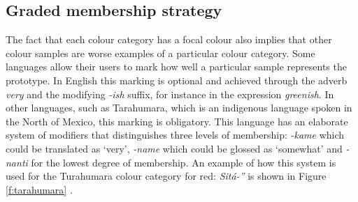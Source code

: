 \subsection{Graded membership strategy}

The fact that each colour category has a focal colour also
implies that other colour samples are worse examples of a particular
colour category. Some languages allow their users to mark how well a
particular sample represents the prototype. In English this marking is
optional and achieved through the adverb \textit{very} and the modifying
\textit{-ish} suffix, for instance in the expression \textit{greenish}. In other
languages, such as Tarahumara, which is an indigenous language spoken
in the North of Mexico, this marking is obligatory. This language has
an elaborate system of modifiers that distinguishes three levels of
membership: \textit{-kame} which could be translated as `very', \textit{-name}
which could be glossed as `somewhat' and \textit{-nanti} for the lowest
degree of membership. An example of how this system is used for the
Turahumara colour category for red: \textit{Sit\'a-''} is shown in Figure
\ref{f:tarahumara} \citep{burgress83tarahumara}.


